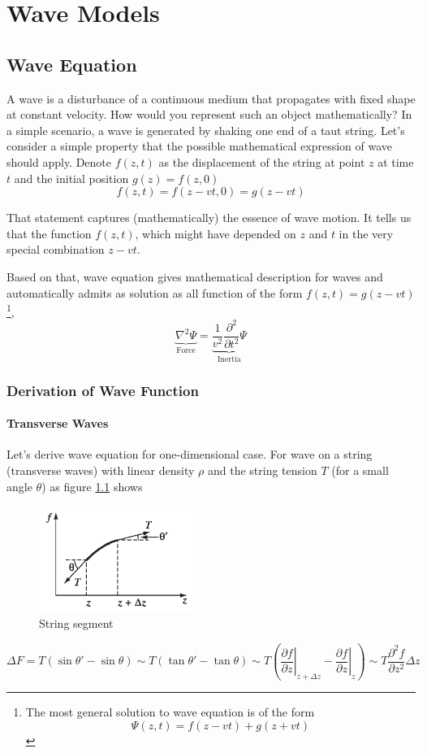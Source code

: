 \documentclass[UTF8]{book}
\begin{document}
\chapter{Wave Models}


\section{Wave Equation}
A wave is a disturbance of a continuous medium that propagates with fixed shape at constant velocity. How would you represent such an object mathematically? In a simple scenario, a wave is generated by shaking one end of a taut
string. Let's consider a simple property that the possible mathematical expression of wave should apply. Denote $f(z,t)$ as the displacement of the string at point $z$ at time $t$ and the initial position $g(z)=f(z,0)$
\[f(z,t)=f(z-vt,0)=g(z-vt)\]

That statement captures (mathematically) the essence of wave motion. It tells us that the function $f(z, t)$, which might have depended on $z$ and $t$ in the very special combination $z-vt$.

Based on that, wave equation gives mathematical description for waves and automatically admits as solution as all function of the form $f(z,t)=g(z-vt)$\footnote{The most general solution to wave equation is of the form
\[\Psi (z,t)=f(z-vt)+g(z+vt)\]},
\begin{equation}\label{eq:6}
\underbrace{\nabla ^2\Psi }_\text{Force}=\underbrace{\frac{1}{v^2}\frac{\partial ^2}{\partial t^2}\Psi}_\text{Inertia}
\end{equation}


\subsection{Derivation of Wave Function}


\subsubsection{Transverse Waves}
Let's derive wave equation for one-dimensional case. For wave on a string (transverse waves) with 
linear density $\rho $ and the string tension $T$ (for a small angle $\theta $) as figure \ref{fig2} 
shows
\begin{figure}[H]
\centering
\includegraphics[width=0.45\textwidth]{Figure/2.PNG}
\caption{String segment}
\label{fig2}
\end{figure}
\[\Delta F=T(\sin \theta '-\sin \theta )\sim T(\tan \theta '-\tan \theta )\sim T\left(\left.\frac{\partial f}{\partial z}\right|_{z+\Delta z}-\left.\frac{\partial f}{\partial z}\right|_{z}\right)\sim T\frac{\partial ^2f}{\partial z^2}\Delta z\]
\end{document}
